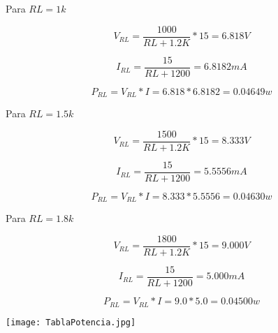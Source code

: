 \documentclass[a4paper, 11pt]{article}
\begin{document}
Para $RL=1k$

\begin{equation*}
V_{RL}=\frac{1000}{RL+1.2K}*15=6.818V
\end{equation*}

\begin{equation*}
I_{RL}=\frac{15}{RL+1200}=6.8182mA
\end{equation*}

\begin{equation*}
P_{RL}=V_{RL}*I=6.818*6.8182=0.04649w
\end{equation*}

Para $RL=1.5k$

\begin{equation*}
V_{RL}=\frac{1500}{RL+1.2K}*15=8.333V
\end{equation*}

\begin{equation*}
I_{RL}=\frac{15}{RL+1200}=5.5556mA
\end{equation*}

\begin{equation*}
P_{RL}=V_{RL}*I=8.333*5.5556=0.04630w
\end{equation*}

Para $RL=1.8k$

\begin{equation*}
V_{RL}=\frac{1800}{RL+1.2K}*15=9.000V
\end{equation*}

\begin{equation*}
I_{RL}=\frac{15}{RL+1200}=5.000mA
\end{equation*}

\begin{equation*}
P_{RL}=V_{RL}*I=9.0*5.0=0.04500w
\end{equation*}

\texttt{[image: TablaPotencia.jpg]}
\end{document}
